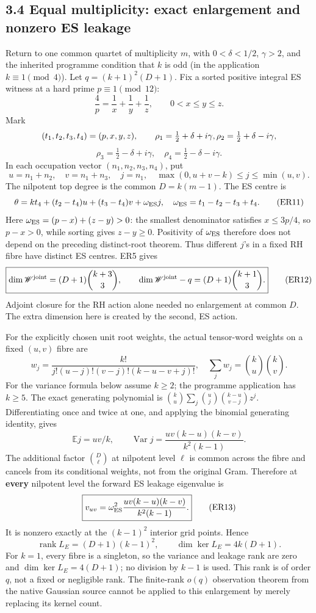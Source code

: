 \documentclass[
  11pt,
]{article}
\begin{document}
\subsection{3.4 Equal multiplicity: exact enlargement and nonzero ES
leakage}\label{equal-multiplicity-exact-enlargement-and-nonzero-es-leakage}

Return to one common quartet of multiplicity \(m\), with
\(0<\delta<1/2\), \(\gamma>2\), and the inherited programme condition
that \(k\) is odd (in the application \(k\equiv1\pmod4\)). Let
\(q=(k+1)^2(D+1)\). Fix a sorted positive integral ES witness at a hard
prime \(p\equiv1\pmod{12}\): \[
\frac4p=\frac1x+\frac1y+\frac1z,\qquad 0<x\le y\le z.
\] Mark \[
(t_1,t_2,t_3,t_4)=(p,x,y,z),\qquad
\rho_1=\tfrac12+\delta+i\gamma,\space
\rho_2=\tfrac12+\delta-i\gamma,
\] \[
\rho_3=\tfrac12-\delta+i\gamma,\quad\rho_4=\tfrac12-\delta-i\gamma.
\] In each occupation vector \((n_1,n_2,n_3,n_4)\), put \[
u=n_1+n_2,\quad v=n_1+n_3,\quad j=n_1,\quad
\max(0,u+v-k)\le j\le\min(u,v).
\] The nilpotent top degree is the common \(D=k(m-1)\). The ES centre is
\[
\theta=kt_4+(t_2-t_4)u+(t_3-t_4)v+\omega_{\rm ES} j,
\quad\omega_{\rm ES}=t_1-t_2-t_3+t_4.
\tag{ER11}
\] Here \(\omega_{\rm ES}=(p-x)+(z-y)>0\): the smallest denominator
satisfies \(x\le3p/4\), so \(p-x>0\), while sorting gives \(z-y\ge0\).
Positivity of \(\omega_{\rm ES}\) therefore does not depend on the
preceding distinct-root theorem. Thus different \(j\)'s in a fixed RH
fibre have distinct ES centres. ER5 gives \[
\boxed{\dim\mathscr W^{\rm joint}=(D+1)\binom{k+3}{3},\qquad
\dim\mathscr W^{\rm joint}-q=(D+1)\binom{k+1}{3}.} \tag{ER12}
\] Adjoint closure for the RH action alone needed no enlargement at
common \(D\). The extra dimension here is created by the second, ES
action.

For the explicitly chosen unit root weights, the actual tensor-word
weights on a fixed \((u,v)\) fibre are \[
w_j=\frac{k!}{j!(u-j)!(v-j)!(k-u-v+j)!},
\quad \sum_jw_j=\binom ku\binom kv.
\] For the variance formula below assume \(k\ge2\); the programme
application has \(k\ge5\). The exact generating polynomial is
\(\binom ku\sum_j\binom uj\binom{k-u}{v-j}z^j\). Differentiating once
and twice at one, and applying the binomial generating identity, gives
\[
\mathbb E j=uv/k,\qquad
\operatorname{Var}j=\frac{uv(k-u)(k-v)}{k^2(k-1)}.
\] The additional factor \(\binom D\ell\) at nilpotent level \(\ell\) is
common across the fibre and cancels from its conditional weights, not
from the original Gram. Therefore at \textbf{every} nilpotent level the
forward ES leakage eigenvalue is \[
\boxed{v_{uv}=\omega_{\rm ES}^2\frac{uv(k-u)(k-v)}{k^2(k-1)}.} \tag{ER13}
\] It is nonzero exactly at the \((k-1)^2\) interior grid points. Hence
\[
\boxed{\operatorname{rank}L_E=(D+1)(k-1)^2,\qquad
\dim\ker L_E=4k(D+1).} \tag{ER14}
\] For \(k=1\), every fibre is a singleton, so the variance and leakage
rank are zero and \(\dim\ker L_E=4(D+1)\); no division by \(k-1\) is
used. This rank is of order \(q\), not a fixed or negligible rank. The
finite-rank \(o(q)\) observation theorem from the native Gaussian source
cannot be applied to this enlargement by merely replacing its kernel
count.
\end{document}
